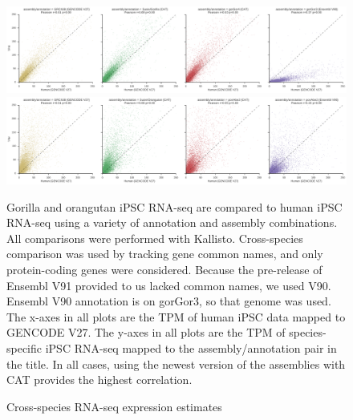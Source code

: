 \documentclass[fleqn,10pt]{wlscirep}
\begin{document}
\begin{figure}
\includegraphics[width=0.8\paperwidth,keepaspectratio]{gorilla_kallisto.pdf}

\includegraphics[width=0.8\paperwidth,keepaspectratio]{orangutan_kallisto.pdf}
\caption{Cross-species RNA-seq expression estimates}

Gorilla and orangutan iPSC RNA-seq are compared to human iPSC RNA-seq using a variety of annotation and assembly combinations. All comparisons were performed with Kallisto. Cross-species comparison was used by tracking gene common names, and only protein-coding genes were considered. Because the pre-release of Ensembl V91 provided to us lacked common names, we used V90. Ensembl V90 annotation is on gorGor3, so that genome was used. The x-axes in all plots are the TPM of human iPSC data mapped to GENCODE V27. The y-axes in all plots are the TPM of species-specific iPSC RNA-seq mapped to the assembly/annotation pair in the title. In all cases, using the newest version of the assemblies with CAT provides the highest correlation.
\label{supp_fig:primate_expression}
\end{figure}
\end{document}
